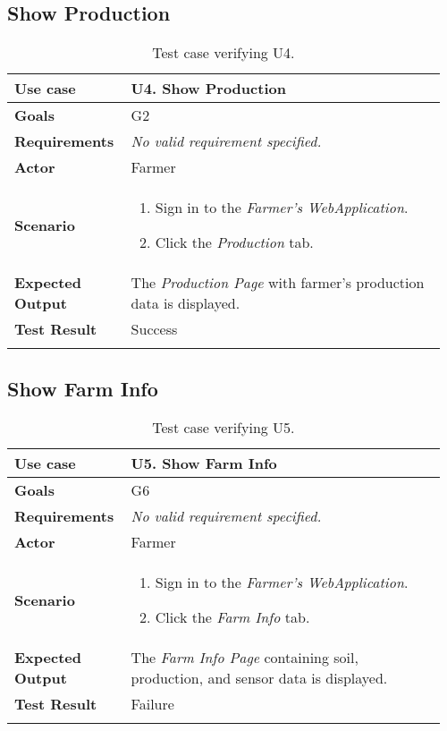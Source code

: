 \subsection{Show Production}

\begin{longtable}{@{}p{0.25\linewidth}p{0.71\linewidth}@{}}
	\toprule
	\textbf{Use case} & \textbf{U4.} Show Production\\
	\midrule
	\textbf{Goals} & G2\\
	\midrule
	\textbf{Requirements} & \textit{No valid requirement specified.}\\
	\midrule
	\textbf{Actor} & Farmer\\
	\midrule
	\textbf{Scenario} &
	\begin{enumerate}[leftmargin=.4cm,noitemsep,topsep=0pt,before=\vspace{-3mm},after=\vspace{-4mm}]
		\item Sign in to the \textit{Farmer's WebApplication}.
		\item Click the \textit{Production} tab.
	\end{enumerate}\\
	\midrule
	\textbf{Expected Output} & The \textit{Production Page} with farmer's production data is displayed.\\
	\midrule
	\textbf{Test Result} & Success\\
	\bottomrule
	\caption{Test case verifying U4.}
\end{longtable}

\subsection{Show Farm Info}

\begin{longtable}{@{}p{0.25\linewidth}p{0.71\linewidth}@{}}
	\toprule
	\textbf{Use case} & \textbf{U5.} Show Farm Info\\
	\midrule
	\textbf{Goals} & G6\\
	\midrule
	\textbf{Requirements} & \textit{No valid requirement specified.}\\
	\midrule
	\textbf{Actor} & Farmer\\
	\midrule
	\textbf{Scenario} &
	\begin{enumerate}[leftmargin=.4cm,noitemsep,topsep=0pt,before=\vspace{-3mm},after=\vspace{-4mm}]
		\item Sign in to the \textit{Farmer's WebApplication}.
		\item Click the \textit{Farm Info} tab.
	\end{enumerate}\\
	\midrule
	\textbf{Expected Output} & The \textit{Farm Info Page} containing soil, production, and sensor data is displayed.\\
	\midrule
	\textbf{Test Result} & Failure\\
	\bottomrule
	\caption{Test case verifying U5.}
\end{longtable}

